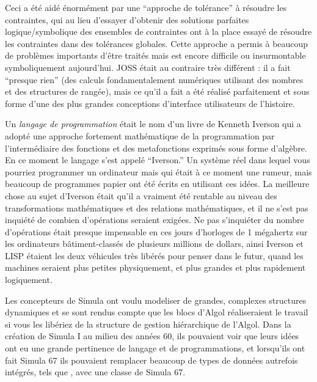 \documentclass[a4paper,10pt,twoside]{book}
\begin{document}
Ceci a \'et\'e aid\'e \'enorm\'ement par une ``approche de tol\'erance'' \`a r\'esoudre les contraintes, qui au lieu d'essayer d'obtenir des solutions parfaites logique/symbolique des ensembles de contraintes ont \`a la place essay\'e de r\'esoudre les contraintes dans des tol\'erances globales. Cette approche a permis \`a beaucoup de probl\`emes importants d'\^etre trait\'es mais est encore difficile ou insurmontable symboliquement aujourd'hui.
JOSS \'etait au contraire tr\`es diff\'erent : il a fait ``presque rien'' (des calculs fondamentalement num\'eriques utilisant des nombres et des structures de rang\'ee), mais ce qu'il a fait a \'et\'e r\'ealis\'e parfaitement et sous forme d'une des plus grandes conceptions d'interface utilisateurs de l'histoire.

Un \emph{langage de programmation} \'etait le nom d'un livre de Kenneth Iverson qui a adopt\'e une approche fortement math\'ematique de la programmation par l'interm\'ediaire des fonctions et des metafonctions exprim\'es sous forme d'alg\`ebre. En ce moment le langage s'est appel\'e ``Iverson.'' Un syst\`eme r\'eel dans lequel vous pourriez programmer un ordinateur mais qui \'etait \`a ce moment une rumeur, mais beaucoup de programmes papier ont \'et\'e \'ecrits en utilisant ces id\'ees. La meilleure chose au sujet d'Iverson \'etait qu'il a vraiment \'et\'e rentable au niveau  des transformations math\'ematiques et des relations math\'ematiques, et il ne s'est pas inqui\'et\'e de combien d'op\'erations seraient exig\'ees. Ne pas s'inqui\'eter du nombre d'op\'erations \'etait presque impensable en ces jours d'horloges de 1 m\'egahertz sur les ordinateurs b\^atiment-class\'es de plusieurs millions de dollars, ainsi Iverson et LISP \'etaient les deux v\'ehicules tr\`es lib\'er\'es pour penser dans le futur, quand les machines seraient plus petites physiquement, et plus grandes et plus rapidement logiquement.


Les concepteurs de Simula ont voulu modeliser de grandes, complexes structures dynamiques  et se sont rendus compte que les blocs d'Algol r\'ealiseraient le travail si vous les lib\'eriez de la structure de gestion hi\'erarchique de l'Algol. Dans la cr\'eation de Simula I au milieu des ann\'ees 60, ils pouvaient voir que leurs id\'ees ont eu une grande pertinence de langage et de programmations, et lorsqu'ils ont fait Simula 67 ils pouvaient remplacer beaucoup de types de donn\'ees autrefois int\'egr\'es, tels que , avec une classe de Simula 67.
\end{document}
